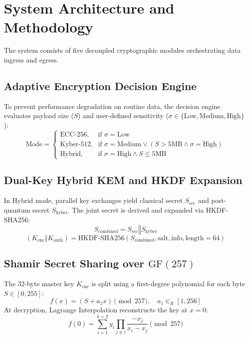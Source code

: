 \documentclass[journal,twoside]{IEEEtran}
\begin{document}
\section{System Architecture and Methodology}
The system consists of five decoupled cryptographic modules orchestrating data ingress and egress.

\subsection{Adaptive Encryption Decision Engine}
To prevent performance degradation on routine data, the decision engine evaluates payload size ($S$) and user-defined sensitivity ($\sigma \in \{\text{Low}, \text{Medium}, \text{High}\}$):
\begin{equation}
\text{Mode} = \begin{cases} 
\text{ECC-256}, & \text{if } \sigma = \text{Low} \\
\text{Kyber-512}, & \text{if } \sigma = \text{Medium} \lor (S > 5\text{MB} \land \sigma = \text{High}) \\
\text{Hybrid}, & \text{if } \sigma = \text{High} \land S \le 5\text{MB}
\end{cases}
\end{equation}

\subsection{Dual-Key Hybrid KEM and HKDF Expansion}
In Hybrid mode, parallel key exchanges yield classical secret $S_{\text{ecc}}$ and post-quantum secret $S_{\text{kyber}}$. The joint secret is derived and expanded via HKDF-SHA256:
\begin{equation}
S_{\text{combined}} = S_{\text{ecc}} \mathbin{\Vert} S_{\text{kyber}}
\end{equation}
\begin{equation}
(K_{\text{enc}} \mathbin{\Vert} K_{\text{auth}}) = \text{HKDF-SHA256}(S_{\text{combined}}, \text{salt}, \text{info}, \text{length}=64)
\end{equation}

\subsection{Shamir Secret Sharing over $\text{GF}(257)$}
The 32-byte master key $K_{\text{enc}}$ is split using a first-degree polynomial for each byte $S \in [0, 255]$:
\begin{equation}
f(x) = (S + a_1 x) \pmod{257}, \quad a_1 \in_R [1, 256]
\end{equation}
At decryption, Lagrange Interpolation reconstructs the key at $x=0$:
\begin{equation}
f(0) = \sum_{i=1}^{k=2} y_i \prod_{j \neq i} \frac{-x_j}{x_i - x_j} \pmod{257}
\end{equation}
\end{document}

